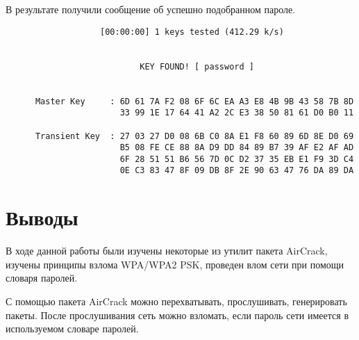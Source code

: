 \documentclass[10pt,a4paper,titlepage]{article}
\begin{document}
В результате получили сообщение об успешно подобранном пароле.
\begin{verbatim}   
                   [00:00:00] 1 keys tested (412.29 k/s)


                           KEY FOUND! [ password ]


      Master Key     : 6D 61 7A F2 08 6F 6C EA A3 E8 4B 9B 43 58 7B 8D 
                       33 99 1E 17 64 41 A2 2C E3 38 50 81 61 D0 B0 11 

      Transient Key  : 27 03 27 D0 08 6B C0 8A E1 F8 60 89 6D 8E D0 69 
                       B5 08 FE CE 88 8A D9 DD 84 89 B7 39 AF E2 AF AD
                       6F 28 51 51 B6 56 7D 0C D2 37 35 EB E1 F9 3D C4 
                       0E C3 83 47 8F 09 DB 8F 2E 90 63 47 76 DA 89 DA 
\end{verbatim}

\section{Выводы}
В ходе данной работы были изучены некоторые из утилит пакета AirCrack, изучены принципы взлома WPA/WPA2 PSK, проведен влом сети при помощи словаря паролей.

С помощью пакета AirCrack можно перехватывать, прослушивать, генерировать пакеты. После прослушивания сеть можно взломать, если пароль сети имеется в используемом словаре паролей.
\end{document}
